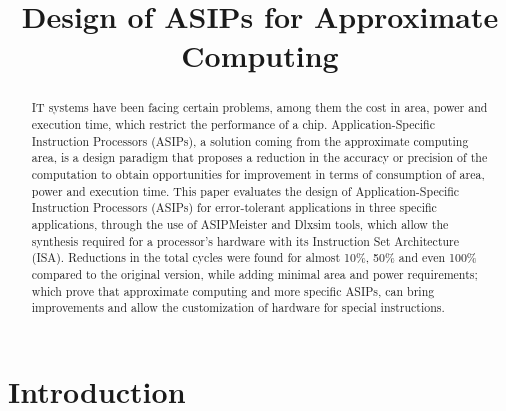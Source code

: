 \documentclass[conference]{IEEEtran}
\begin{document}
 \graphicspath{{./}{./fig/}}
%
\title{Design of ASIPs for Approximate Computing}


\author{
}

\maketitle

\begin{abstract}
IT systems have been facing certain problems, among them the cost in area, power and execution time, which
restrict the performance of a chip. Application-Specific Instruction Processors (ASIPs), a solution
coming from the approximate computing area, is a design paradigm that proposes a reduction in the accuracy
or precision of the computation to obtain opportunities for improvement in terms of consumption of
area, power and execution time. This paper evaluates the design of Application-Specific Instruction Processors (ASIPs)
for error-tolerant applications in three specific applications, through the use of ASIPMeister and Dlxsim tools, which
allow the synthesis required for a processor's hardware with its Instruction Set Architecture (ISA). Reductions
in the total cycles were found for almost 10\%, 50\% and even 100\% compared to the original version, while
adding minimal area and power requirements; which prove that approximate computing and more specific ASIPs,
can bring improvements and allow the customization of hardware for special instructions. 
\end{abstract}


\IEEEpeerreviewmaketitle



\section{Introduction}
\end{document}
